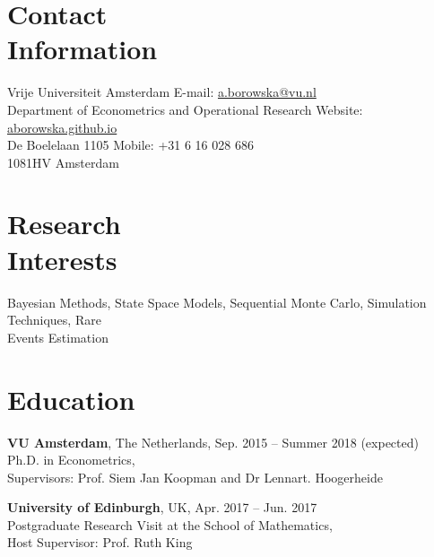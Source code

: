 \documentclass[margin,line]{resume}
\begin{document}
\begin{resume}
    \section{\mysidestyle Contact\\Information}
    Vrije Universiteit Amsterdam \hfill  E-mail: \url{a.borowska@vu.nl} \\
    Department of Econometrics and Operational Research \hfill Website: \url{aborowska.github.io}\\ \vspace{0mm}%
    De Boelelaan 1105  \hfill Mobile: +31 6 16 028 686\\
    1081HV Amsterdam\\ \vspace{-4.5mm}%
    \section{\mysidestyle Research\\Interests}
    
    Bayesian Methods, State Space Models, Sequential Monte Carlo, Simulation Techniques, Rare \\ Events Estimation
    \section{\mysidestyle Education}
    \textbf{VU Amsterdam},  The Netherlands, \hfill Sep. 2015 -- Summer 2018 (expected)\\
	Ph.D. in Econometrics,\\ 
    Supervisors: Prof. Siem Jan Koopman and Dr Lennart. Hoogerheide

\vspace{-1mm}

    \textbf{University of Edinburgh},  UK, \hfill Apr. 2017 -- Jun. 2017\\
	Postgraduate Research Visit at the School of Mathematics,\\ 
    Host Supervisor: Prof. Ruth King


\end{resume}
\end{document}
